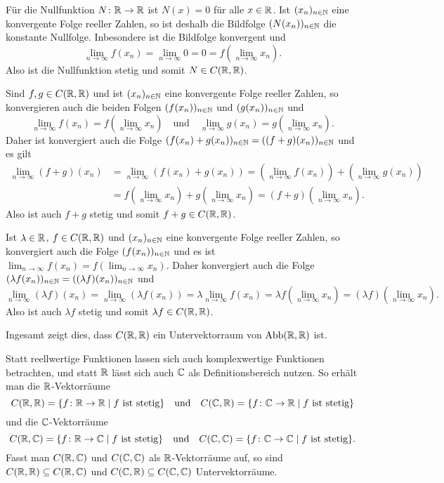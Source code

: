Für die Nullfunktion $N \colon \mathbb{R} \to \mathbb{R}$ ist $N(x) = 0$ für alle $x \in \mathbb{R}$. Ist $(x_n)_{n \in \mathbb{N}}$ eine konvergente Folge reeller Zahlen, so ist deshalb die Bildfolge $(N(x_n))_{n \in \mathbb{N}}$ die konstante Nullfolge. Inbesondere ist die Bildfolge konvergent und
\[
 \lim_{n \to \infty} f(x_n)
 = \lim_{n \to \infty} 0
 = 0
 = f\left( \lim_{n \to \infty} x_n \right).
\]
Also ist die Nullfunktion stetig und somit $N \in C(\mathbb{R},\mathbb{R})$.

Sind $f,g \in C(\mathbb{R},\mathbb{R})$ und ist $(x_n)_{n \in \mathbb{N}}$ eine konvergente Folge reeller Zahlen, so konvergieren auch die beiden Folgen $(f(x_n))_{n \in \mathbb{N}}$ und $(g(x_n))_{n \in \mathbb{N}}$ und
\[
 \lim_{n \to \infty} f(x_n) = f\left( \lim_{n \to \infty} x_n \right)
 \quad\text{und}\quad
 \lim_{n \to \infty} g(x_n) = g\left( \lim_{n \to \infty} x_n \right).
\]
Daher ist konvergiert auch die Folge $(f(x_n) + g(x_n))_{n \in \mathbb{N}} = ((f+g)(x_n))_{n \in \mathbb{N}}$ und es gilt
\begin{align*}
 \lim_{n \to \infty} (f+g)(x_n)
 &= \lim_{n \to \infty} (f(x_n) + g(x_n))
 = \left(\lim_{n \to \infty} f(x_n)\right) + \left(\lim_{n \to \infty} g(x_n)\right) \\
 &=f\left( \lim_{n \to \infty} x_n \right) + g\left( \lim_{n \to \infty} x_n \right)
 = (f+g)\left( \lim_{n \to \infty} x_n \right).
\end{align*}
Also ist auch $f+g$ stetig und somit $f+g \in C(\mathbb{R}, \mathbb{R})$.

Ist $\lambda \in \mathbb{R}$, $f \in C(\mathbb{R}, \mathbb{R})$ und $(x_n)_{n \in \mathbb{N}}$ eine konvergente Folge reeller Zahlen, so konvergiert auch die Folge $(f(x_n))_{n \in \mathbb{N}}$ und es ist $\lim_{n \to \infty} f(x_n) = f(\lim_{n \to \infty} x_n)$. Daher konvergiert auch die Folge $(\lambda f(x_n))_{n \in \mathbb{N}} = ((\lambda f)(x_n))_{n \in \mathbb{N}}$ und
\[
 \lim_{n \to \infty} (\lambda f)(x_n)
 = \lim_{n \to \infty}( \lambda f(x_n) )
 = \lambda \lim_{n \to \infty} f(x_n)
 = \lambda f\left( \lim_{n \to \infty} x_n \right)
 = (\lambda f) \left( \lim_{n \to \infty} x_n \right).
\]
Also ist auch $\lambda f$ stetig und somit $\lambda f \in C(\mathbb{R}, \mathbb{R})$.

Ingesamt zeigt dies, dass $C(\mathbb{R}, \mathbb{R})$ ein Untervektorraum von $\mathrm{Abb}(\mathbb{R}, \mathbb{R})$ ist.


\begin{bem}
 Statt reellwertige Funktionen lassen sich auch komplexwertige Funktionen betrachten, und statt $\mathbb{R}$ lässt sich auch $\mathbb{C}$ als Definitionsbereich nutzen. So erhält man die $\mathbb{R}$-Vektorräume
 \[
  C(\mathbb{R},\mathbb{R}) = \{f \colon \mathbb{R} \to \mathbb{R} \mid \text{$f$ ist stetig}\}
  \quad\text{und}\quad
  C(\mathbb{C},\mathbb{R}) = \{f \colon \mathbb{C} \to \mathbb{R} \mid \text{$f$ ist stetig}\}
 \]
 und die $\mathbb{C}$-Vektorräume
 \[
  C(\mathbb{R},\mathbb{C}) = \{f \colon \mathbb{R} \to \mathbb{C} \mid \text{$f$ ist stetig}\}
  \quad\text{und}\quad
  C(\mathbb{C},\mathbb{C}) = \{f \colon \mathbb{C} \to \mathbb{C} \mid \text{$f$ ist stetig}\}.
 \]
 Fasst man $C(\mathbb{R}, \mathbb{C})$ und $C(\mathbb{C}, \mathbb{C})$ als $\mathbb{R}$-Vektorräume auf, so sind $C(\mathbb{R}, \mathbb{R}) \subseteq C(\mathbb{R}, \mathbb{C})$ und $C(\mathbb{C}, \mathbb{R}) \subseteq C(\mathbb{C}, \mathbb{C})$ Untervektorräume.
\end{bem}



